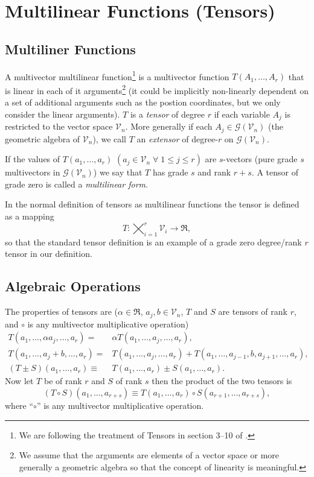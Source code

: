 \documentclass[12pt]{report}
\newcommand{\lp}{\left (}
\newcommand{\rp}{\right )}
\newcommand{\f}[2]{{#1}\lp {#2} \rp}
\newcommand{\be}{\begin{equation}}
\newcommand{\ee}{\end{equation}}
\begin{document}
\section{Multilinear Functions (Tensors)}\label{MLtrans}

\subsection{Multiliner Functions}
A multivector multilinear function\footnote{We are following the treatment of Tensors in section 3--10 of \cite{Hestenes}.} is a 
multivector function $\f{T}{A_{1},\dots,A_{r}}$ that is linear in each of it arguments\footnote{We assume that the arguments 
are elements of a vector space or more generally a geometric algebra so that the concept of linearity is meaningful.} 
(it could be implicitly non-linearly dependent 
on a set of additional arguments such as the postion coordinates, but we only consider the linear arguments). $T$ is a \emph{tensor}
of degree $r$ if each variable $A_{j}$ is restricted to the vector space $\mathcal{V}_{n}$.  More generally if each 
$A_{j}\in\f{\mathcal{G}}{\mathcal{V}_{n}}$ (the geometric algebra of $\mathcal{V}_{n}$), we call $T$ an \emph{extensor} of
degree-$r$ on $\f{\mathcal{G}}{\mathcal{V}_{n}}$.

If the values of $\f{T}{a_{1},\dots,a_{r}}$ $\lp a_{j}\in\mathcal{V}_{n}\;\forall\; 1\le j \le r \rp$ are $s$-vectors 
(pure grade $s$ multivectors in 
$\f{\mathcal{G}}{\mathcal{V}_{n}}$) we say that $T$ has grade $s$ and rank $r+s$.  A tensor of grade zero is called a
\emph{multilinear form}.

In the normal definition of tensors as multilinear functions the tensor is defined as a mapping 
$$T:\bigtimes_{i=1}^{r}\mathcal{V}_{i}\rightarrow\Re,$$ so that the standard tensor definition is an example of a grade zero
degree/rank $r$ tensor in our definition.

\subsection{Algebraic Operations}
The properties of tensors are ($\alpha\in\Re$, $a_{j},b\in\mathcal{V}_{n}$, $T$ and $S$ are tensors of rank $r$,
and $\circ$ is any multivector multiplicative operation)
\begin{align}
	\f{T}{a_{1},\dots,\alpha a_{j},\dots,a_{r}} =& \alpha\f{T}{a_{1},\dots,a_{j},\dots,a_{r}}, \\
	\f{T}{a_{1},\dots,a_{j}+b,\dots,a_{r}} =& \f{T}{a_{1},\dots,a_{j},\dots,a_{r}}+ \f{T}{a_{1},\dots,a_{j-1},b,a_{j+1},\dots,a_{r}}, \\
	\f{\lp T\pm S\rp}{a_{1},\dots,a_{r}} \equiv& \f{T}{a_{1},\dots,a_{r}}\pm\f{S}{a_{1},\dots,a_{r}}.
\end{align}
Now let $T$ be of rank $r$ and $S$ of rank $s$ then the product of the two tensors is
\be
	\f{\lp T\circ S\rp}{a_{1},\dots,a_{r+s}} \equiv \f{T}{a_{1},\dots,a_{r}}\circ\f{S}{a_{r+1},\dots,a_{r+s}},
\ee
where ``$\circ$'' is any multivector multiplicative operation.
\end{document}
